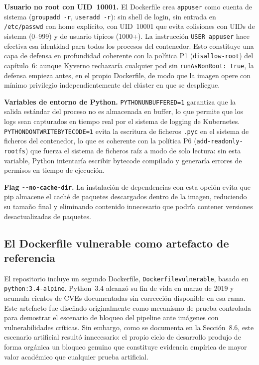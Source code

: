 \textbf{Usuario no root con UID~10001.} El Dockerfile crea \texttt{appuser} como cuenta de sistema (\texttt{groupadd -r}, \texttt{useradd -r}): sin shell de login, sin entrada en \texttt{/etc/passwd} con home explícito, con UID~10001 que evita colisiones con UIDs de sistema (0--999) y de usuario típicos (1000+). La instrucción \texttt{USER appuser} hace efectiva esa identidad para todos los procesos del contenedor. Esto constituye una capa de defensa en profundidad coherente con la política P1 (\texttt{disallow-root}) del capítulo~6: aunque Kyverno rechazaría cualquier pod sin \texttt{runAsNonRoot:\,true}, la defensa empieza antes, en el propio Dockerfile, de modo que la imagen opere con mínimo privilegio independientemente del clúster en que se despliegue.

\textbf{Variables de entorno de Python.} \texttt{PYTHONUNBUFFERED=1} garantiza que la salida estándar del proceso no es almacenada en buffer, lo que permite que los logs sean capturados en tiempo real por el sistema de logging de Kubernetes. \texttt{PYTHONDONTWRITEBYTECODE=1} evita la escritura de ficheros \texttt{.pyc} en el sistema de ficheros del contenedor, lo que es coherente con la política P6 (\texttt{add-readonly-rootfs}) que fuerza el sistema de ficheros raíz a modo de solo lectura: sin esta variable, Python intentaría escribir bytecode compilado y generaría errores de permisos en tiempo de ejecución.

\textbf{Flag \texttt{-{}-no-cache-dir}.} La instalación de dependencias con esta opción evita que pip almacene el caché de paquetes descargados dentro de la imagen, reduciendo su tamaño final y eliminando contenido innecesario que podría contener versiones desactualizadas de paquetes.

\subsection{El Dockerfile vulnerable como artefacto de referencia}

El repositorio incluye un segundo Dockerfile, \texttt{Dockerfilevulnerable}, basado en \texttt{python:3.4-alpine}. Python~3.4 alcanzó su fin de vida en marzo de 2019 y acumula cientos de CVEs documentadas sin corrección disponible en esa rama. Este artefacto fue diseñado originalmente como mecanismo de prueba controlada para demostrar el escenario de bloqueo del pipeline ante imágenes con vulnerabilidades críticas. Sin embargo, como se documenta en la Sección~8.6, este escenario artificial resultó innecesario: el propio ciclo de desarrollo produjo de forma orgánica un bloqueo genuino que constituye evidencia empírica de mayor valor académico que cualquier prueba artificial.

